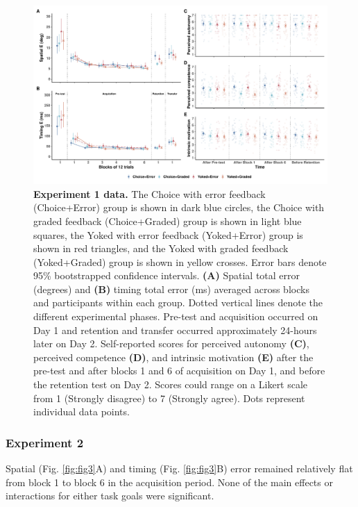 \documentclass[
  man, donotrepeattitle,floatsintext]{apa7}
\begin{document}
\begin{figure}

{\centering \includegraphics{../../figs/fig2} 

}

\caption{\small \onehalfspacing \textbf{Experiment 1 data.} The Choice with error feedback (Choice+Error) group is shown in dark blue circles, the Choice with graded feedback (Choice+Graded) group is shown in light blue squares, the Yoked with error feedback (Yoked+Error) group is shown in red triangles, and the Yoked with graded feedback (Yoked+Graded) group is shown in yellow crosses. Error bars denote 95\% bootstrapped confidence intervals. \textbf{(A)} Spatial total error (degrees) and \textbf{(B)} timing total error (ms) averaged across blocks and participants within each group. Dotted vertical lines denote the different experimental phases. Pre-test and acquisition occurred on Day 1 and retention and transfer occurred approximately 24-hours later on Day 2. Self-reported scores for perceived autonomy \textbf{(C)}, perceived competence \textbf{(D)}, and intrinsic motivation \textbf{(E)} after the pre-test and after blocks 1 and 6 of acquisition on Day 1, and before the retention test on Day 2. Scores could range on a Likert scale from 1 (Strongly disagree) to 7 (Strongly agree). Dots represent individual data points.}\label{fig:fig2}
\end{figure}



\hypertarget{experiment-2-3}{%
\subsubsection{Experiment 2}\label{experiment-2-3}}

Spatial (Fig. \ref{fig:fig3}A) and timing (Fig. \ref{fig:fig3}B) error remained relatively flat from block 1 to block 6 in the acquisition period. None of the main effects or interactions for either task goals were significant.
\end{document}
